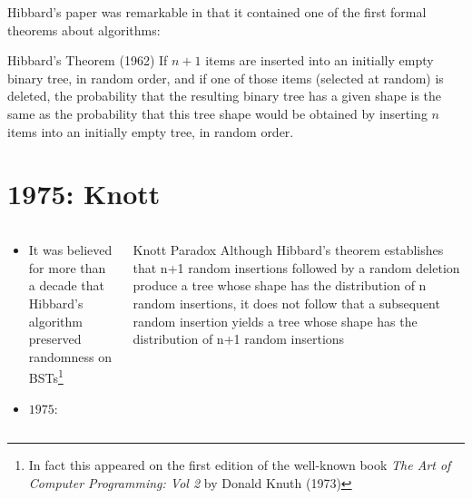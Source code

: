 \documentclass{beamer}
\begin{document}
\begin{frame}
    Hibbard’s paper was remarkable in that it contained one of the first formal theorems about algorithms:
    \pause
    \begin{block}{Hibbard's Theorem (1962)}
        If $n + 1$ items are inserted into an initially empty binary tree, in random order, and if one of those items (selected at random) is deleted, the probability that the resulting binary tree has a given shape is the same as the probability that this tree shape would be obtained by inserting $n$ items into an initially empty tree, in random order.
    \end{block}
\end{frame}

\section{1975: Knott}

\begin{frame}
    
\begin{columns}[c]
    \begin{column}{0.5\textwidth}
     \begin{itemize}
         \item It was believed for more than a decade that Hibbard's algorithm preserved randomness on BSTs\footnote{In fact this appeared on the first edition of the well-known book \textit{The Art of Computer Programming: Vol 2} by Donald Knuth (1973)}
             \pause
         \item $1975$: \cite{knott1975deletion}
     \end{itemize}
    \end{column}
    \begin{column}{0.5\textwidth}
        \begin{center}
            \begin{block}{Knott Paradox}
                Although Hibbard’s theorem establishes that n+1 random insertions
                followed by a random deletion produce a tree whose shape has the distribution of n random insertions, it does not follow that a
                subsequent random insertion yields a tree whose shape has the distribution of n+1 random insertions
            \end{block}
        \end{center}
    \end{column}
    
\end{columns}
\end{frame}
\end{document}
